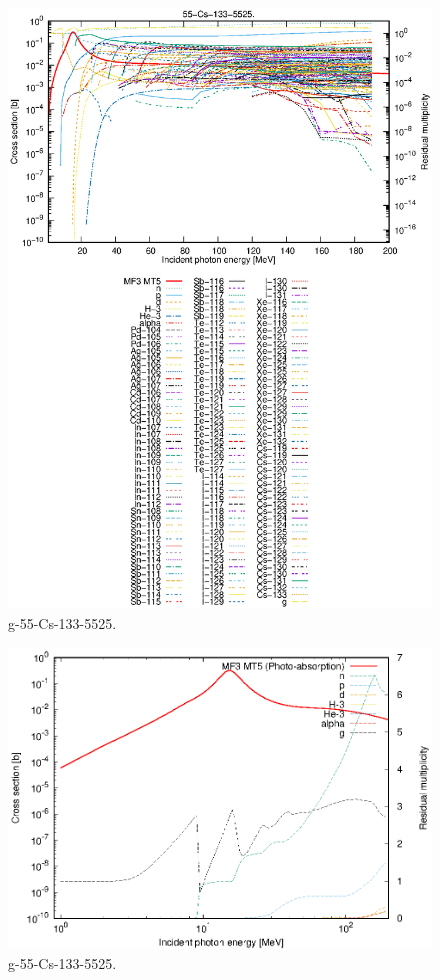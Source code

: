 \begin{figure}
 \includegraphics[width=\linewidth]{eps/g_55-Cs-133_5525.eps}
  \caption{g-55-Cs-133-5525.}
\end{figure}
\newpage \clearpage

\begin{figure}
 \includegraphics[width=\linewidth]{eps-log/g_55-Cs-133_5525.eps}
 \caption{g-55-Cs-133-5525.}
\end{figure}
\newpage \clearpage

